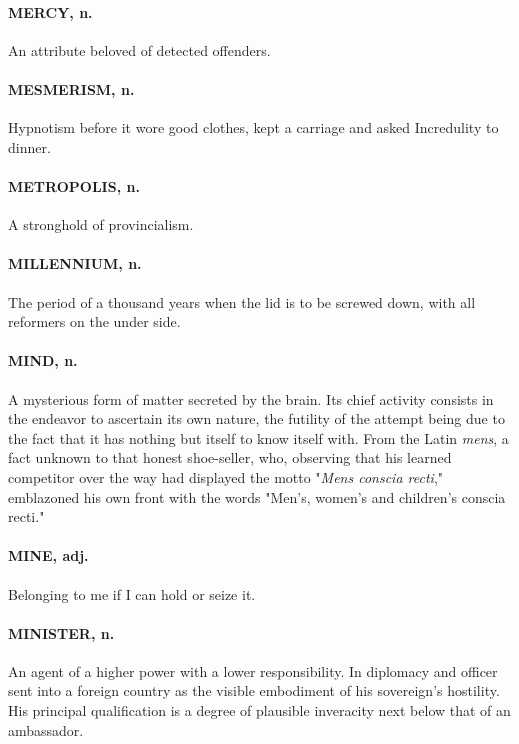 \documentclass[11pt]{article}
\begin{document}
\paragraph{MERCY, n.}  An attribute beloved of detected offenders.

\paragraph{MESMERISM, n.}  Hypnotism before it wore good clothes, kept a carriage
and asked Incredulity to dinner.

\paragraph{METROPOLIS, n.}  A stronghold of provincialism.

\paragraph{MILLENNIUM, n.}  The period of a thousand years when the lid is to be
screwed down, with all reformers on the under side.

\paragraph{MIND, n.}  A mysterious form of matter secreted by the brain.  Its
chief activity consists in the endeavor to ascertain its own nature,
the futility of the attempt being due to the fact that it has nothing
but itself to know itself with.  From the Latin {\em mens}, a fact unknown
to that honest shoe-seller, who, observing that his learned competitor
over the way had displayed the motto "{\em Mens conscia recti},"
emblazoned his own front with the words "Men's, women's and children's
conscia recti."

\paragraph{MINE, adj.}  Belonging to me if I can hold or seize it.

\paragraph{MINISTER, n.}  An agent of a higher power with a lower responsibility.
In diplomacy and officer sent into a foreign country as the visible
embodiment of his sovereign's hostility.  His principal qualification
is a degree of plausible inveracity next below that of an ambassador.
\end{document}
